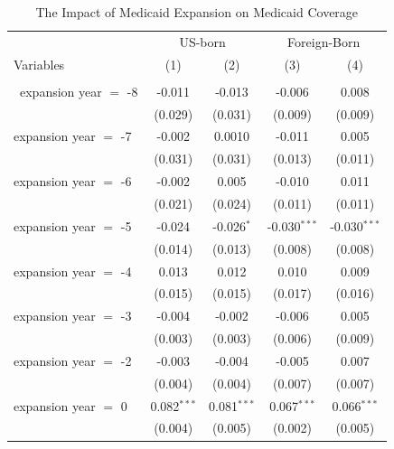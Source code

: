 \documentclass[
]{article}
\begin{document}
\begin{table}[htbp]
   \caption{The Impact of Medicaid Expansion on Medicaid Coverage }
   \centering
   \small
   \begin{tabular}{lcccc}
      \tabularnewline \midrule \midrule
       & \multicolumn{2}{c}{US-born} & \multicolumn{2}{c}{Foreign-Born} \\ \cmidrule(lr){2-3} \cmidrule(lr){4-5}
      Variables             & (1)           & (2)           & (3)            & (4)\\  
      \midrule \\\
      expansion year $=$ -8 & -0.011        & -0.013        & -0.006         & 0.008\\   
                            & (0.029)       & (0.031)       & (0.009)        & (0.009)\\   
      expansion year $=$ -7 & -0.002        & 0.0010        & -0.011         & 0.005\\   
                            & (0.031)       & (0.031)       & (0.013)        & (0.011)\\   
      expansion year $=$ -6 & -0.002        & 0.005         & -0.010         & 0.011\\   
                            & (0.021)       & (0.024)       & (0.011)        & (0.011)\\   
      expansion year $=$ -5 & -0.024        & -0.026$^{*}$  & -0.030$^{***}$ & -0.030$^{***}$\\   
                            & (0.014)       & (0.013)       & (0.008)        & (0.008)\\   
      expansion year $=$ -4 & 0.013         & 0.012         & 0.010          & 0.009\\   
                            & (0.015)       & (0.015)       & (0.017)        & (0.016)\\   
      expansion year $=$ -3 & -0.004        & -0.002        & -0.006         & 0.005\\   
                            & (0.003)       & (0.003)       & (0.006)        & (0.009)\\   
      expansion year $=$ -2 & -0.003        & -0.004        & -0.005         & 0.007\\   
                            & (0.004)       & (0.004)       & (0.007)        & (0.007)\\   
      expansion year $=$ 0  & 0.082$^{***}$ & 0.081$^{***}$ & 0.067$^{***}$  & 0.066$^{***}$\\   
                            & (0.004)       & (0.005)       & (0.002)        & (0.005)\\   

\end{tabular}
\end{table}
\end{document}
